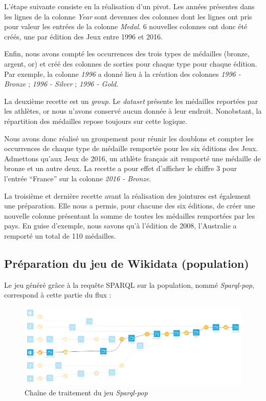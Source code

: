 \documentclass[hidelinks, 12pt]{report}
\begin{document}
L'étape suivante consiste en la réalisation d'un pivot. Les années présentes dans les lignes de la colonne \textit{Year} sont devenues des colonnes dont les lignes ont pris pour valeur les entrées de la colonne \textit{Medal}. 6 nouvelles colonnes ont donc été créés, une par édition des Jeux entre 1996 et 2016.

Enfin, nous avons compté les occurrences des trois types de médailles (bronze, argent, or) et créé des colonnes de sorties pour chaque type pour chaque édition. Par exemple, la colonne \emph{1996} a donné lieu à la création des colonnes \emph{1996 - Bronze} ; \emph{1996 - Silver} ; \emph{1996 - Gold}.

La deuxième recette est un \emph{group}. Le \emph{dataset} présente les médailles reportées par les athlètes, or nous n'avons conservé aucun donnée à leur endroit. Nonobstant, la répartition des médailles repose toujours sur cette logique.

Nous avons donc réalisé un groupement pour réunir les doublons et compter les occurrences de chaque type de médaille remportée pour les six éditions des Jeux. Admettons qu'aux Jeux de 2016, un athlète français ait remporté une médaille de bronze et un autre deux. La recette a pour effet d'afficher le chiffre 3 pour l'entrée \enquote{France} sur la colonne \emph{2016 - Bronze}.

La troisième et dernière recette avant la réalisation des jointures est également une préparation. Elle nous a permis, pour chacune des six éditions, de créer une nouvelle colonne présentant la somme de toutes les médailles remportées par les pays. En guise d'exemple, nous savons qu'à l'édition de 2008, l'Australie a remporté un total de 110 médailles.





%





\subsection{Préparation du jeu de Wikidata (population)}

Le jeu généré grâce à la requête SPARQL sur la population, nommé \textit{Sparql-pop}, correspond à cette partie du flux :

\begin{center}
	\begin{figure}[H]
		\setlength{\belowcaptionskip}{-35pt}
		\includegraphics[scale=0.35]{images/flow-medals-sparql-pop.png}
		\caption{Chaîne de traitement du jeu \textit{Sparql-pop}}
	\end{figure}
\end{center}
\end{document}
